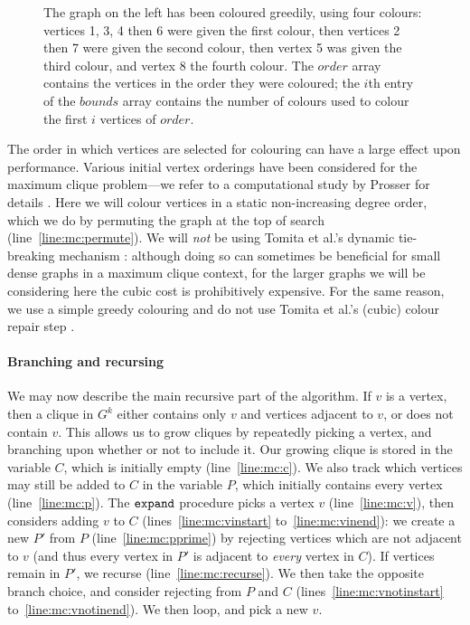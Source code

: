 \documentclass[letterpaper]{article}
\newcommand{\mcline}[1]{line~\ref{line:mc:#1}}
\newcommand{\mclinerange}[2]{lines~\ref{line:mc:#1} to~\ref{line:mc:#2}}
\newcommand{\bounds}{\mathit{bounds}}
\newcommand{\order}{\mathit{order}}
\newcommand{\expand}{\FuncSty{expand}}
\begin{document}
\begin{figure}[b]
    \centering
    \begin{tikzpicture}
    \end{tikzpicture}

    \caption{The graph on the left has been coloured greedily, using four colours: vertices 1, 3, 4
        then 6 were given the first colour, then vertices 2 then 7 were given the second colour,
        then vertex 5 was given the third colour, and vertex 8 the fourth colour. The $\order$ array
        contains the vertices in the order they were coloured; the $i$th entry of the $\bounds$ array
        contains the number of colours used to colour the first $i$ vertices of $\order$.}
    \label{figure:colours}
\end{figure}

The order in which vertices are selected for colouring can have a large effect upon performance.
Various initial vertex orderings have been considered for the maximum clique problem---we refer to a
computational study by Prosser for details \cite{Prosser:2012}. Here we will colour vertices in a
static non-increasing degree order, which we do by permuting the graph at the top of search
(\mcline{permute}). We will \emph{not} be using Tomita et al.'s dynamic tie-breaking mechanism
\cite{Tomita:2010}: although doing so can sometimes be beneficial for small dense graphs in a
maximum clique context, for the larger graphs we will be considering here the cubic cost is
prohibitively expensive. For the same reason, we use a simple greedy colouring and do not use Tomita
et al.'s (cubic) colour repair step \cite{Tomita:2010}.

\paragraph{Branching and recursing}

We may now describe the main recursive part of the algorithm. If $v$ is a vertex, then a clique in
$G^k$ either contains only $v$ and vertices adjacent to $v$, or does not contain $v$. This allows us
to grow cliques by repeatedly picking a vertex, and branching upon whether or not to include it. Our
growing clique is stored in the variable $C$, which is initially empty (\mcline{c}). We also track
which vertices may still be added to $C$ in the variable $P$, which initially contains every vertex
(\mcline{p}). The $\expand$ procedure picks a vertex $v$ (\mcline{v}), then considers adding $v$ to
$C$ (\mclinerange{vinstart}{vinend}): we create a new $P'$ from $P$ (\mcline{pprime}) by
rejecting vertices which are not adjacent to $v$ (and thus every vertex in $P'$ is adjacent to
\emph{every} vertex in $C$). If vertices remain in $P'$, we recurse (\mcline{recurse}). We then take
the opposite branch choice, and consider rejecting from $P$ and $C$
(\mclinerange{vnotinstart}{vnotinend}). We then loop, and pick a new $v$.
\end{document}
